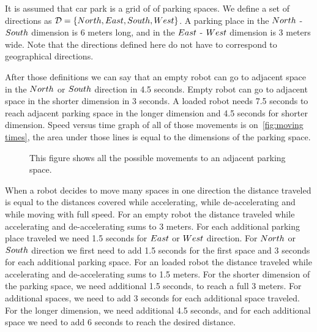 It is assumed that car park is a grid of of parking spaces. We define a set of
directions as $\mathcal{D} = \{North, East, South, West\}$. A parking place in the $North$ -
$South$ dimension is 6 meters long, and in the $East$ - $West$ dimension is 3
meters wide. Note that the directions defined here do not have to correspond to
geographical directions.

After those definitions we can say that an empty robot can go to adjacent space
in the $North$ or $South$ direction in 4.5 seconds. Empty robot can go to adjacent
space in the shorter dimension in 3 seconds. A loaded robot needs 7.5 seconds
to reach adjacent parking space in the longer dimension and 4.5 seconds for
shorter dimension. Speed versus time graph of all of those movements is
on~\autoref{fig:moving times}, the area under those lines is equal to the
dimensions of the parking space.
\begin{figure}[h]
    \begin{center}
        
        \caption{This figure shows all the possible movements to an adjacent
        parking space.}
        \label{fig:moving times}
    \end{center}
\end{figure}

When a robot decides to move many spaces in one direction the distance traveled
is equal to the distances covered while accelerating, while de-accelerating and
while moving with full speed. For an empty robot the distance traveled while
accelerating and de-accelerating sums to 3 meters. For each additional parking
place traveled we need 1.5 seconds for $East$ or $West$ direction. For $North$ or
$South$ direction we first need to add 1.5 seconds for the first space and 3
seconds for each additional parking space. For an loaded robot the distance traveled
while accelerating and de-accelerating sums to 1.5 meters. For the shorter
dimension of the parking space, we need additional 1.5 seconds, to reach a full 3
meters. For additional spaces, we need to add 3 seconds for each additional
space traveled. For the longer dimension, we need additional 4.5 seconds, and
for each additional space we need to add 6 seconds to reach the desired
distance.

